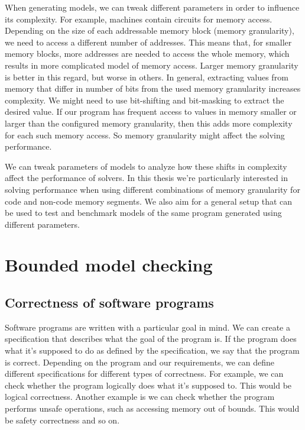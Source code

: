 \documentclass[12pt]{article}
\begin{document}
When generating models, we can tweak different parameters in order to influence
its complexity. For example, machines contain circuits for memory access.
Depending on the size of each addressable memory block (memory granularity), we
need to access a different number of addresses. This means that, for smaller
memory blocks, more addresses are needed to access the whole memory, which
results in more complicated model of memory access. Larger memory granularity
is better in this regard, but worse in others. In general, extracting values
from memory that differ in number of bits from the used memory granularity
increases complexity. We might need to use bit-shifting and bit-masking to
extract the desired value. If our program has frequent access to values in
memory smaller or larger than the configured memory granularity, then this adds
more complexity for each such memory access. So memory granularity might affect
the solving performance.

We can tweak parameters of models to analyze how these shifts in complexity
affect the performance of solvers. In this thesis we're particularly
interested in solving performance when using different combinations of memory
granularity for code and non-code memory segments. We also aim for a general
setup that can be used to test and benchmark models of the same program
generated using different parameters. 

\newpage

\section{Bounded model checking}

\subsection{Correctness of software programs}

Software programs are written with a particular goal in mind. We can create a 
specification that describes what the goal of the program is. If the program 
does what it's supposed to do as defined by the specification, we say that the
program is correct. Depending on the program and our requirements, we can define
different specifications for different types of correctness. For example, we can
check whether the program logically does what it's supposed to. This would be 
logical correctness. Another example is we can check whether the program
performs unsafe operations, such as accessing memory out of bounds. This would
be safety correctness and so on.
\end{document}
